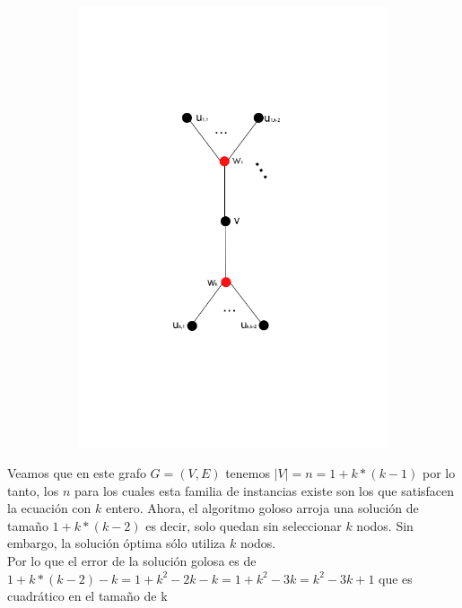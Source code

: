 \begin{figure}[H]
\centering
\begin{subfigure}[b]{0.5\textwidth}
                \includegraphics[width=\textwidth]{imagenes/grafos-ej3-tp3-3.png}
                \caption{}
        \end{subfigure}%
\end{figure}


Veamos que en este grafo $G=(V,E)$ tenemos $|V| = n = 1 + k*(k-1)$ por lo tanto, los $n$ para los cuales esta familia de instancias existe son los que satisfacen la ecuación con $k$ entero. Ahora, el algoritmo goloso arroja una solución de tamaño $1 + k*(k-2)$ es decir, solo quedan sin seleccionar $k$ nodos. Sin embargo, la solución óptima sólo utiliza $k$ nodos.\\

Por lo que el error de la solución golosa es de $1 + k*(k-2) - k = 1 + k^2 -2k -k = 1 + k^2 - 3k = k^2 - 3k + 1$ que es cuadrático en el tamaño de k


